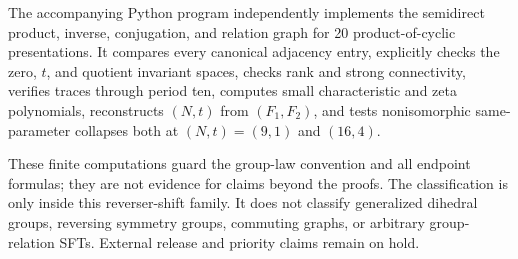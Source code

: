 \documentclass[11pt,a4paper]{amsart}
\theoremstyle{definition}
\theoremstyle{remark}
\begin{document}
The accompanying Python program independently implements the semidirect
product, inverse, conjugation, and relation graph for 20 product-of-cyclic
presentations.  It compares every canonical adjacency entry, explicitly
checks the zero, $t$, and quotient invariant spaces, checks rank and strong
connectivity, verifies traces through period ten, computes small
characteristic and zeta polynomials, reconstructs $(N,t)$ from $(F_1,F_2)$,
and tests nonisomorphic same-parameter collapses both at $(N,t)=(9,1)$ and
$(16,4)$.

These finite computations guard the group-law convention and all endpoint
formulas; they are not evidence for claims beyond the proofs.  The
classification is only inside this reverser-shift family.  It does not
classify generalized dihedral groups, reversing symmetry groups, commuting
graphs, or arbitrary group-relation SFTs.  External release and priority
claims remain on hold.



\end{document}
